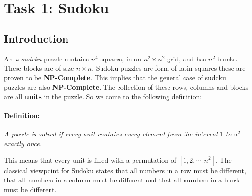 \section{Task 1: Sudoku}\label{sec:sudoku}
\subsection{Introduction}

An \textit{n-sudoku} puzzle contains $n^{4}$ squares, in an $n^{2} \times n^{2}$ grid, and has $n^{2}$ blocks. These blocks are of size $n \times n$. Sudoku puzzles are form of latin squares these are proven to be \textbf{NP-Complete}. This implies that the general case of sudoku puzzles are also \textbf{NP-Complete}. The collection of these rows, columns and blocks are all \textbf{units} in the puzzle. So we come to the following definition:

\paragraph*{Definition:}
\textit{A puzzle is solved if every unit contains every element from the interval $1$ to $n^2$ exactly once.}

This means that every unit is filled with a permutation of $[1,2,\cdots,n^{2}]$. 
The classical viewpoint for Sudoku states that all numbers in a row must be different, that all numbers in a column must be different and that all numbers in a block must be different.\\

